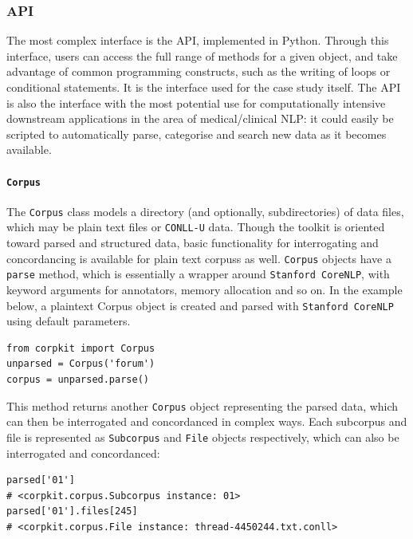 \subsubsection{API}

The most complex interface is the \gls{API}, implemented in Python. Through this interface, users can access the full range of methods for a given object, and take advantage of common programming constructs, such as the writing of loops or conditional statements. It is the interface used for the case study itself. The \gls{API} is also the interface with the most potential use for computationally intensive downstream applications in the area of medical\slash clinical \gls{NLP}: it could easily be scripted to automatically parse, categorise and search new data as it becomes available.

\paragraph{\texttt{Corpus}}

The \texttt{Corpus} class models a directory (and optionally, subdirectories) of data files, which may be plain text files or \texttt{CONLL-U} data. Though the toolkit is oriented toward parsed and structured data, basic functionality for interrogating and concordancing is available for plain text \glspl{corpus} as well. \texttt{Corpus} objects have a \texttt{parse} method, which is essentially a wrapper around \texttt{Stanford CoreNLP}, with keyword arguments for annotators, memory allocation and so on. In the example below, a plaintext Corpus object is created and parsed with \texttt{Stanford CoreNLP} using default parameters.

\begin{verbatim}
from corpkit import Corpus
unparsed = Corpus('forum')
corpus = unparsed.parse()
\end{verbatim} 
%
This method returns another \texttt{Corpus} object representing the parsed data, which can then be interrogated and concordanced in complex ways. Each subcorpus and file is represented as \texttt{Subcorpus} and \texttt{File} objects respectively, which can also be interrogated and concordanced:

\begin{verbatim}
parsed['01']
# <corpkit.corpus.Subcorpus instance: 01>
parsed['01'].files[245]
# <corpkit.corpus.File instance: thread-4450244.txt.conll>
\end{verbatim}


